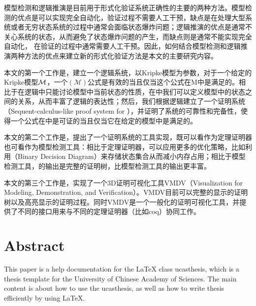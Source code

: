 模型检测和逻辑推演是目前用于形式化验证系统正确性的主要的两种方法。模型检测的优点是可以实现完全自动化，验证过程不需要人工干预，缺点是在处理大型系统或者无穷状态系统的过程中通常会面临状态爆炸问题；逻辑推演的优点是通常不关心系统的状态，从而避免了状态爆炸问题的产生，而缺点则是通常不能实现完全自动化， 在验证的过程中通常需要人工干预。因此，如何结合模型检测和逻辑推演两种方法的优点来建立新的形式化验证方法是本文的主要研究内容。

本文的第一个工作是，建立一个逻辑系统\CTLP{}，\CTLP{}以Kripke模型为参数，对于一个给定的Kripke模型$\cal M$，一个\CTLP$(\mathcal{M})$公式是有效的当且仅当这个公式在M中是满足的。相比于在\CTL{}逻辑中只能讨论模型中当前状态的性质，在\CTLP{}中我们可以定义模型中的状态之间的关系，从而丰富了\CTL{}逻辑的表达性；然后，我们根据逻辑\CTLP{}建立了一个证明系统\SCTL{}（Sequent-calculus-like proof system for \CTLP{}），并证明了\SCTL{}系统的可靠性和完备性，使得一个公式在\SCTL{}中是可证的当且仅当它在给定的模型中是满足的。

本文的第二个工作是，提出了一个\SCTL{}证明系统的工具实现\sctlprov{}，\sctlprov{}既可以看作为定理证明器也可看作为模型检测工具：相比于定理证明器，\sctlprov{}可以应用更多的优化策略，比如利用\BDD{}（Binary Decision Diagram）来存储状态集合从而减小内存占用；相比于模型检测工具，\sctlprov{}的输出是完整的证明树，比模型检测工具的输出更丰富。

本文的第三个工作是，实现了一个3D证明可视化工具\textsf{VMDV}（Visualization for Modeling, Demonstration, and Verification）。\textsf{VMDV}目前可以完整的显示\sctlprov{}的证明树以及高亮显示\sctlprov{}的证明过程。同时\textsf{VMDV}是一个一般化的证明可视化工具，并提供了不同的接口用来与不同的定理证明器（比如coq）协同工作。


\chapter*{Abstract}%

This paper is a help documentation for the \LaTeX{} class ucasthesis, which is  a thesis template for the University of Chinese Academy of Sciences. The main content is about how to use the ucasthesis, as well as how to write thesis efficiently by using \LaTeX{}.

